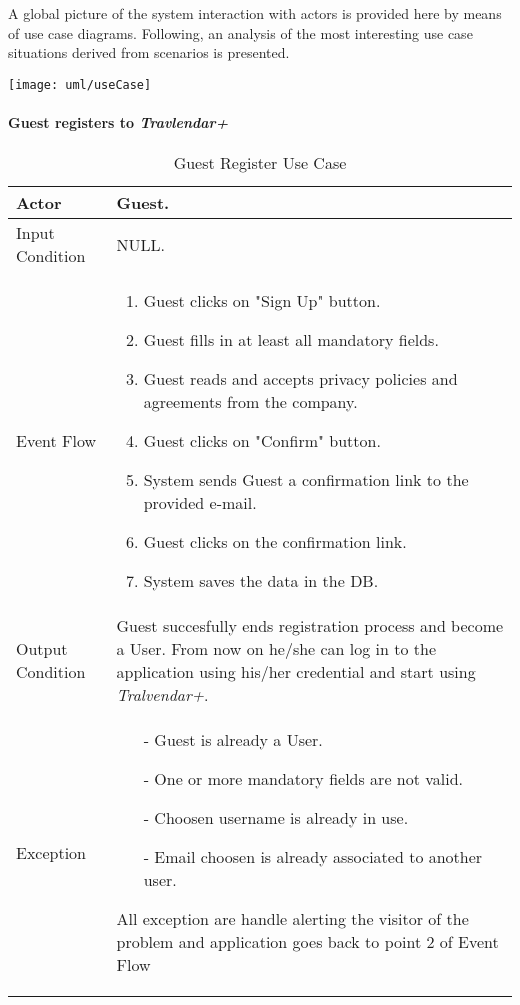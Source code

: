 A global picture of the system interaction with actors is provided here by means of use case diagrams. Following, an analysis of the most interesting use case situations derived from scenarios is presented.

	\texttt{[image: uml/useCase]}


	\paragraph{Guest registers to \textit{Travlendar+}}\label{login_useCase}
		\begin{table}[H]
			\begin{tabular}{| l | p{} | }
				\hline
				\hline
				Actor	&		Guest. \\
				\hline
				Input Condition		&		NULL. \\
				\hline
				Event Flow		&		\begin{enumerate}
													\item Guest clicks on "Sign Up" button.
													\item Guest fills in at least all mandatory fields.
													\item Guest reads and accepts privacy policies and agreements from the company.
													\item Guest clicks on "Confirm" button.
													\item System sends Guest a confirmation link to the provided e-mail.
													\item Guest clicks on the confirmation link.
													\item	 System saves the data in the DB.
												\end{enumerate} \\
				\hline
				Output Condition		&		Guest succesfully ends registration process and become a User. From now on he/she can log in to the application using his/her credential and start using \textit{Tralvendar+}. \\
				\hline		
				Exception		&		\begin{itemize}
												\item[-] Guest is already a User.
												\item[-] One or more mandatory fields are not valid.
												\item[-] Choosen username is already in use.
												\item[-] Email choosen is already associated to another user.
											\end{itemize}
											All exception are handle alerting the visitor of the problem and application goes back to point 2 of Event Flow \\
				\hline
				\hline
			\end{tabular}
			\caption{Guest Register Use Case}
		\end{table}

